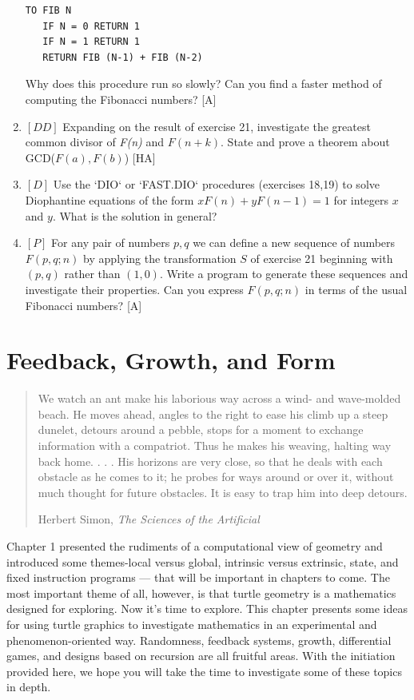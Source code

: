 \documentclass{book}
\begin{document}
\begin{enumerate}
\begin{verbatim}
TO FIB N
   IF N = 0 RETURN 1
   IF N = 1 RETURN 1
   RETURN FIB (N-1) + FIB (N-2)
\end{verbatim}
Why does this procedure run so slowly? Can you find a faster method
of computing the Fibonacci numbers? [A]
\item $[DD]$ Expanding on the result of exercise 21, investigate the greatest
common divisor of {\em F(n)} and $F(n + k)$. State and prove a theorem about
GCD($F(a), F(b)$) [HA]
\item $[D]$ Use the \textsc{`DIO`} or \textsc{`FAST.DIO`} procedures (exercises 18,19) to solve
Diophantine equations of the form $xF(n) + yF(n - 1) = 1$ for integers
$x$ and $y$. What is the solution in general?  
\item $[P]$ For any pair of numbers $p,q$ we can define a new sequence of
numbers $F(p, q; n)$ by applying the transformation $S$ of exercise 21 beginning with $(p, q)$ rather than $(1,0)$. Write a program to generate these
sequences and investigate their properties. Can you express $F(p, q; n)$ in
terms of the usual Fibonacci numbers? [A]
\end{enumerate}

\chapter{Feedback, Growth, and Form}
\begin{quote}We watch an ant make his laborious way across a
wind- and wave-molded beach. He moves ahead,
angles to the right to ease his climb up a steep
dunelet, detours around a pebble, stops for a moment to exchange information with a compatriot.
Thus he makes his weaving, halting way back home.
. . . His horizons are very close, so that he deals with
each obstacle as he comes to it; he probes for ways
around or over it, without much thought for future
obstacles. It is easy to trap him into deep detours.

Herbert Simon, {\em The Sciences of the Artificial}\end{quote}

Chapter 1 presented the rudiments of a computational view of geometry
and introduced some themes-local versus global, intrinsic versus extrinsic, state, and fixed instruction programs --- that will be important in
chapters to come. The most important theme of all, however, is that
turtle geometry is a mathematics designed for exploring. Now it's time
to explore. This chapter presents some ideas for using turtle graphics to
investigate mathematics in an experimental and phenomenon-oriented
way. Randomness, feedback systems, growth, differential games, and
designs based on recursion are all fruitful areas. With the initiation
provided here, we hope you will take the time to investigate some of
these topics in depth.
\end{document}
